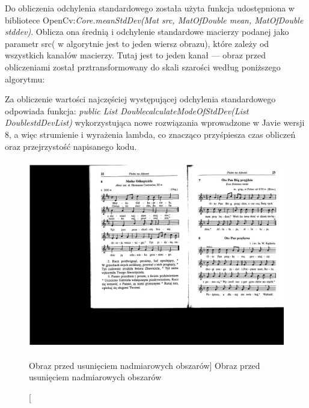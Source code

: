 \documentclass[a4paper,12pt]{article}
\begin{document}
    			Do obliczenia odchylenia standardowego została użyta funkcja udostępniona w bibliotece OpenCv:\textit {Core.meanStdDev(Mat src, MatOfDouble mean, MatOfDouble stddev)}. Oblicza ona średnią i odchylenie standardowe macierzy podanej jako parametr src( w algorytnie jest to jeden wiersz obrazu), które zależy od wszystkich kanałów macierzy. Tutaj jest to jeden kanał --- obraz przed obliczeniami został prztransformowany do skali szarości według poniższego algorytmu:
    			 		
    			Za obliczenie wartości najczęściej występującej odchylenia standardowego odpowiada funkcja: \textit {public List \guilsinglleft Double\guilsinglright calculateModeOfStdDev(List \guilsinglleft Double\guilsinglright stdDevList)}
    			wykorzystująca nowe rozwiązania wprowadzone w Javie wersji 8, a więc strumienie i wyrażenia lambda, co znacząco przyśpiesza czas obliczeń oraz przejrzystość napisanego kodu.  
			
			
    		    \begin{figure}[!ht]  
    			    \begin{center}
    				    \includegraphics[height=8.25cm, frame] {image//exampleImage//002_a.png} 
    			    \end{center}
    			    \caption
    			        [Obraz przed usunięciem nadmiarowych obszarów]
        			    {Obraz przed usunięciem nadmiarowych obszarów}  
    		    \end{figure}
    		    
\end{document}
